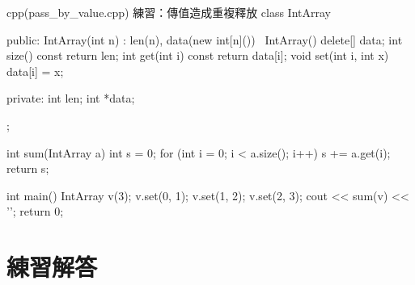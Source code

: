\begin{drills}[label=drills:ch5]
\begin{code}{cpp}{(pass\_by\_value.cpp) 練習：傳值造成重複釋放}
class IntArray {
public:
    IntArray(int n) : len(n), data(new int[n]()) {}
    ~IntArray() { delete[] data; }
    int size() const { return len; }
    int get(int i) const { return data[i]; }
    void set(int i, int x) { data[i] = x; }

private:
    int len;
    int *data;
};

int sum(IntArray a) {
    int s = 0;
    for (int i = 0; i < a.size(); i++) {
        s += a.get(i);
    }
    return s;
}

int main() {
    IntArray v(3);
    v.set(0, 1);
    v.set(1, 2);
    v.set(2, 3);
    cout << sum(v) << '\n';
    return 0;
}
\end{code}
\end{drills}

\section*{練習解答}

